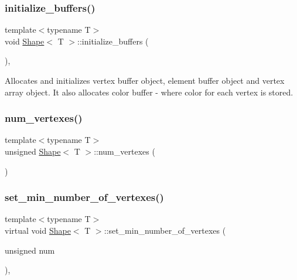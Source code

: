 \mbox{\label{classShape_a8b4f54a694871f9d131fdd105e1ca709}} 
\subsubsection{\texorpdfstring{initialize\+\_\+buffers()}{initialize\_buffers()}}
{\footnotesize\ttfamily template$<$typename T$>$ \\
void \mbox{\hyperlink{classShape}{Shape}}$<$ T $>$\+::initialize\+\_\+buffers (\begin{DoxyParamCaption}{ }\end{DoxyParamCaption})\hspace{0.3cm}{\ttfamily [inline]}, {\ttfamily [protected]}}



Allocates and initializes vertex buffer object, element buffer object and vertex array object. It also allocates color buffer -\/ where color for each vertex is stored. 

\mbox{\label{classShape_a131e85c7f5cad85bffb92e6719117cab}} 
\subsubsection{\texorpdfstring{num\+\_\+vertexes()}{num\_vertexes()}}
{\footnotesize\ttfamily template$<$typename T$>$ \\
unsigned \mbox{\hyperlink{classShape}{Shape}}$<$ T $>$\+::num\+\_\+vertexes (\begin{DoxyParamCaption}{ }\end{DoxyParamCaption})\hspace{0.3cm}{\ttfamily [inline]}}

\mbox{\label{classShape_ac5a35fe1b2ecb8fcfc050a31c8969805}} 
\subsubsection{\texorpdfstring{set\+\_\+min\+\_\+number\+\_\+of\+\_\+vertexes()}{set\_min\_number\_of\_vertexes()}}
{\footnotesize\ttfamily template$<$typename T$>$ \\
virtual void \mbox{\hyperlink{classShape}{Shape}}$<$ T $>$\+::set\+\_\+min\+\_\+number\+\_\+of\+\_\+vertexes (\begin{DoxyParamCaption}\item[{unsigned}]{num }\end{DoxyParamCaption})\hspace{0.3cm}{\ttfamily [inline]}, {\ttfamily [virtual]}}



